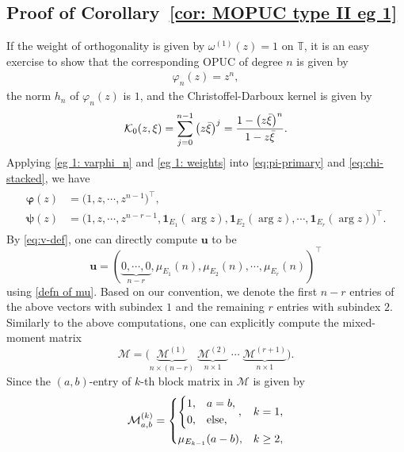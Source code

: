 \documentclass[a4paper,10pt,leqno]{amsart}
\numberwithin{equation}{section}
\theoremstyle{remark}
\newcommand{\TT}{\mathbb{T}}
\begin{document}

\subsection{Proof of Corollary~\ref{cor: MOPUC type II eg 1}}

If the weight of orthogonality is given by $\omega^{(1)}(z) = 1$ on $\TT$, it is an easy exercise to show that the corresponding OPUC of degree $n$ is given by
\begin{align} \label{eg 1: varphi_n}
\varphi_n (z) = z^n,
\end{align}
the norm $h_n$ of $\varphi_n (z)$ is $1$, and the Christoffel-Darboux kernel is given by
\begin{align} \label{eg 1 K0}
\mathcal{K}_0(z, \xi) = \sum_{j=0}^{n-1} \left( z \Bar{\xi} \right)^j = \frac{1 - \left( z \Bar{\xi} \right)^n}{1 - z \Bar{\xi}}.
\end{align}
Applying \eqref{eg 1: varphi_n} and \eqref{eg 1: weights} into \eqref{eq:pi-primary} and \eqref{eq:chi-stacked}, we have
\begin{align}\label{eg 1: varphi, psi}
\begin{aligned}
\boldsymbol{\varphi}(z) &= \big( 1, z,\cdots, z^{n-1} \big)^\top,\\
\boldsymbol{\psi}(z) &= \big( 1, z,\cdots, z^{n-r-1}, \mathbf{1}_{E_1}(\arg z), \mathbf{1}_{E_2}(\arg z), \cdots, \mathbf{1}_{E_r}(\arg z) \big)^\top.
\end{aligned}
\end{align}
By \eqref{eq:v-def}, one can directly compute $\boldsymbol{u}$ to be
\[
\boldsymbol{u} = ( \underbrace{0, \cdots, 0}_{n-r}, \mu_{E_1}(n), \mu_{E_2}(n), \cdots, \mu_{E_r}(n) )^\top
\]
using \eqref{defn of mu}.
Based on our convention, we denote the first $n-r$ entries of the above vectors with subindex $1$ and the remaining $r$ entries with subindex $2$.
Similarly to the above computations, one can explicitly compute the mixed-moment matrix
\[
\bm{\mathcal{M}} = \big( \underbrace{\mathcal{M}^{(1)}}_{n \times (n-r)} \;  \underbrace{\mathcal{M}^{(2)}}_{n \times 1} \;  \cdots \; \underbrace{\mathcal{M}^{(r+1)}}_{n \times 1} \big).
\]
Since the $(a,b)$-entry of $k$-th block matrix in $\bm{\mathcal M}$ is given by
\begin{align} \label{eg 1 M block entry}
\mathcal{M}^{(k)}_{a, b} = \begin{dcases}
    \begin{dcases}
        1, & a = b,\\
        0, & \text{else},
    \end{dcases}, & k=1, \\
    \mu_{E_{k-1}}(a-b), & k \geq 2,
\end{dcases}
\end{align}
\end{document}
